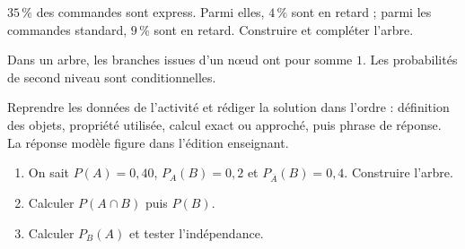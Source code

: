     \begin{activite}
    $35\,\%$ des commandes sont express. Parmi elles, $4\,\%$ sont en retard ; parmi les commandes standard, $9\,\%$ sont en retard. Construire et compléter l'arbre.
    \begin{center}\end{center}
    \end{activite}

    \begin{traceecrite}Dans un arbre, les branches issues d'un nœud ont pour somme $1$. Les probabilités de second niveau sont conditionnelles.\end{traceecrite}

    \begin{exemple}
    Reprendre les données de l'activité et rédiger la solution dans l'ordre : définition des objets, propriété utilisée, calcul exact ou approché, puis phrase de réponse. La réponse modèle figure dans l'édition enseignant.
    \end{exemple}

    \begin{exercice}[-- essentiel]
    \begin{enumerate}\item On sait $P(A)=0{,}40$, $P_A(B)=0{,}2$ et $P_{\overline A}(B)=0{,}4$. Construire l'arbre.\item Calculer $P(A\cap B)$ puis $P(B)$.\item Calculer $P_B(A)$ et tester l'indépendance.\end{enumerate}
    \end{exercice}


